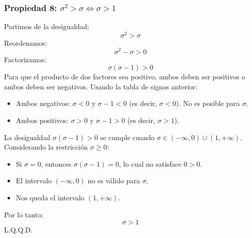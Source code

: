\documentclass[12pt, letterpaper]{article}
\begin{document}
            \subsubsection{Propiedad 8: $\sigma^2 > \sigma \iff \sigma > 1$}
                Partimos de la desigualdad:
                \[\sigma^2 > \sigma \]
                Reordenamos:
                \[\sigma^2-\sigma > 0 \]
                Factorizamos:
                \[\sigma(\sigma-1) > 0 \]
                Para que el producto de dos factores sea positivo, ambos deben ser positivos o ambos deben ser negativos. Usando la tabla de signos anterior:
                \begin{itemize}
                    \item Ambos negativos: $\sigma < 0$ y $\sigma-1 < 0$ (es decir, $\sigma < 0$). No es posible para $\sigma$.
                    \item Ambos positivos: $\sigma > 0$ y $\sigma-1 > 0$ (es decir, $\sigma > 1$).
                \end{itemize}
                La desigualdad $\sigma(\sigma-1) > 0$ se cumple cuando $\sigma \in (-\infty, 0) \cup (1, +\infty)$.
                Considerando la restricción $\sigma \ge 0$:
                \begin{itemize}
                    \item Si $\sigma=0$, entonces $\sigma(\sigma-1)=0$, lo cual no satisface $0>0$.
                    \item El intervalo $(-\infty,0)$ no es válido para $\sigma$.
                    \item Nos queda el intervalo $(1, +\infty)$.
                \end{itemize}
                Por lo tanto:
                \[\sigma > 1\]
                L.Q.Q.D.
                \newpage

    \section{} %

\end{document}
